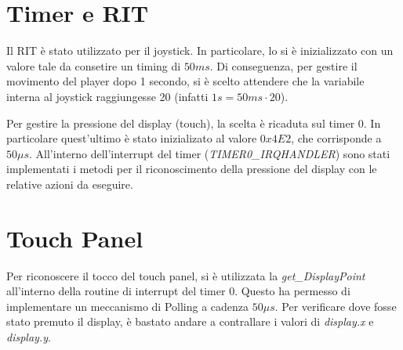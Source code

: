 \documentclass{article}
\begin{document}
\section{Timer e RIT}

Il RIT è stato utilizzato per il joystick. In particolare, lo si è inizializzato con un valore tale da consetire un timing di \( 50ms\). Di conseguenza, per gestire il movimento del player dopo 1 secondo, si è scelto attendere che la variabile interna al joystick raggiungesse 20 (infatti \( 1s = 50ms \cdot 20\)).

Per gestire la pressione del display (touch), la scelta è ricaduta sul timer 0. In particolare quest'ultimo è stato inizializato al valore \( 0x4E2\), che corrisponde a \( 50 \mu s\). All'interno dell'interrupt del timer (\emph{TIMER0\_IRQHANDLER}) sono stati implementati i metodi per il riconoscimento della pressione del display con le relative azioni da eseguire.

\section{Touch Panel}
Per riconoscere il tocco del touch panel, si è utilizzata la \emph{get\_DisplayPoint} all'interno della routine di interrupt del timer 0. Questo ha permesso di implementare un meccanismo di Polling a cadenza \( 50 \mu s\).
Per verificare dove fosse stato premuto il display, è bastato andare a contrallare i valori di \emph{display.x} e \emph{display.y}.
\end{document}
